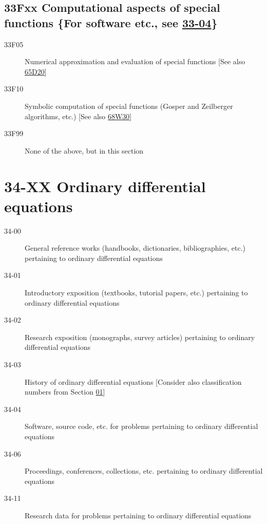 \documentclass[letterpaper]{article}
\begin{document}
\subsection*{33Fxx  Computational aspects of special functions \{For software etc., see \hyperref[33-04]{33-04}\}}\label{33Fxx}
\begin{description}  
\item [33F05]\label{33F05} Numerical approximation and evaluation of special functions [See also \hyperref[65D20]{65D20}]
\item [33F10]\label{33F10} Symbolic computation of special functions (Gosper and Zeilberger algorithms, etc.) [See also \hyperref[68W30]{68W30}]
\item [33F99]\label{33F99} None of the above, but in this section
\end{description}
\section*{34-XX Ordinary differential equations }\label{34-XX}
\begin{description}
\item [34-00]\label{34-00} General reference works (handbooks, dictionaries, bibliographies, etc.) pertaining to ordinary differential equations
\item [34-01]\label{34-01} Introductory exposition (textbooks, tutorial papers, etc.) pertaining to ordinary differential equations
\item [34-02]\label{34-02} Research exposition (monographs, survey articles) pertaining to ordinary differential equations
\item [34-03]\label{34-03} History of ordinary differential equations [Consider also classification numbers from Section \hyperref[01-XX]{01}]
\item [34-04]\label{34-04} Software, source code, etc. for problems pertaining to ordinary differential equations
\item [34-06]\label{34-06} Proceedings, conferences, collections, etc. pertaining to ordinary differential equations
\item [34-11]\label{34-11} Research data for problems pertaining to ordinary differential equations
\end{description}
\end{document}
